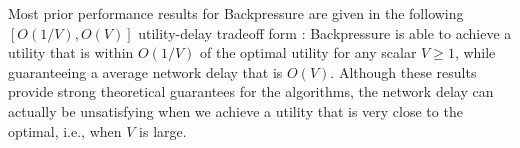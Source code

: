 \documentclass[journal]{IEEEtran}
\begin{document}



Most prior performance results for Backpressure are given in the following $[O(1/V), O(V)]$ utility-delay tradeoff form \cite{neelynowbook}: Backpressure is able to achieve a utility that is within $O(1/V)$ of the optimal utility for any scalar $V\geq1$, while guaranteeing a average network delay that is  $O(V)$. Although these results provide strong theoretical guarantees for the algorithms, the network delay can actually be unsatisfying when we achieve a utility that is very close to the optimal, i.e., when $V$ is large. 
\end{document}
